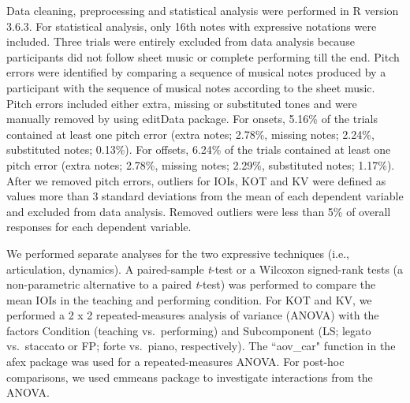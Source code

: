 \documentclass[
  english,
  man,floatsintext]{apa6}
\begin{document}
Data cleaning, preprocessing and statistical analysis were performed in R version 3.6.3. For statistical analysis, only 16th notes with expressive notations were included. Three trials were entirely excluded from data analysis because participants did not follow sheet music or complete performing till the end. Pitch errors were identified by comparing a sequence of musical notes produced by a participant with the sequence of musical notes according to the sheet music. Pitch errors included either extra, missing or substituted tones and were manually removed by using editData package. For onsets, 5.16\% of the trials contained at least one pitch error (extra notes; 2.78\%, missing notes; 2.24\%, substituted notes; 0.13\%). For offsets, 6.24\% of the trials contained at least one pitch error (extra notes; 2.78\%, missing notes; 2.29\%, substituted notes; 1.17\%). After we removed pitch errors, outliers for IOIs, KOT and KV were defined as values more than 3 standard deviations from the mean of each dependent variable and excluded from data analysis. Removed outliers were less than 5\% of overall responses for each dependent variable.

We performed separate analyses for the two expressive techniques (i.e., articulation, dynamics). A paired-sample \emph{t}-test or a Wilcoxon signed-rank tests (a non-parametric alternative to a paired \emph{t}-test) was performed to compare the mean IOIs in the teaching and performing condition. For KOT and KV, we performed a 2 x 2 repeated-measures analysis of variance (ANOVA) with the factors Condition (teaching vs.~performing) and Subcomponent (LS; legato vs.~staccato or FP; forte vs.~piano, respectively). The ``aov\_car" function in the afex package was used for a repeated-measures ANOVA. For post-hoc comparisons, we used emmeans package to investigate interactions from the ANOVA.
\end{document}
